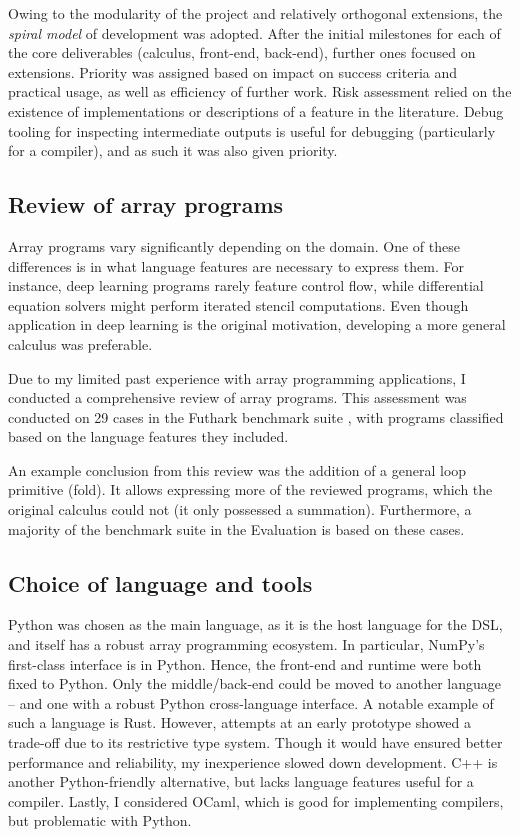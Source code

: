Owing to the modularity of the project and relatively orthogonal extensions, the \textit{spiral model} of development was adopted. After the initial milestones for each of the core deliverables (calculus, front-end, back-end), further ones focused on extensions. Priority was assigned based on impact on success criteria and practical usage, as well as efficiency of further work. Risk assessment relied on the existence of implementations or descriptions of a feature in the literature. Debug tooling for inspecting intermediate outputs is useful for debugging (particularly for a compiler), and as such it was also given priority.

\subsection{Review of array programs}
\label{suite-review}

Array programs vary significantly depending on the domain. One of these differences is in what language features are necessary to express them. For instance, deep learning programs rarely feature control flow, while differential equation solvers might perform iterated stencil computations. Even though application in deep learning is the original motivation, developing a more general calculus was preferable.

Due to my limited past experience with array programming applications, I conducted a comprehensive review of array programs. This assessment was conducted on 29 cases in the Futhark benchmark suite \cite{The_Futhark_Hackers_futhark-benchmarks}, with programs classified based on the language features they included.

An example conclusion from this review was the addition of a general loop primitive (fold). It allows expressing more of the reviewed programs, which the original calculus could not (it only possessed a summation). 
Furthermore, a majority of the benchmark suite in the Evaluation is based on these cases. 

\subsection{Choice of language and tools}

Python was chosen as the main language, as it is the host language for the DSL, and itself has a robust array programming ecosystem. 
In particular, NumPy's first-class interface is in Python. 
Hence, the front-end and runtime were both fixed to Python. 
Only the middle/back-end could be moved to another language -- and one with a robust Python cross-language interface. A notable example of such a language is Rust. However, attempts at an early prototype showed a trade-off due to its restrictive type system. Though it would have ensured better performance and reliability, my inexperience slowed down development. C++ is another Python-friendly alternative, but lacks language features useful for a compiler. Lastly, I considered OCaml, which is good for implementing compilers, but problematic with Python. 

